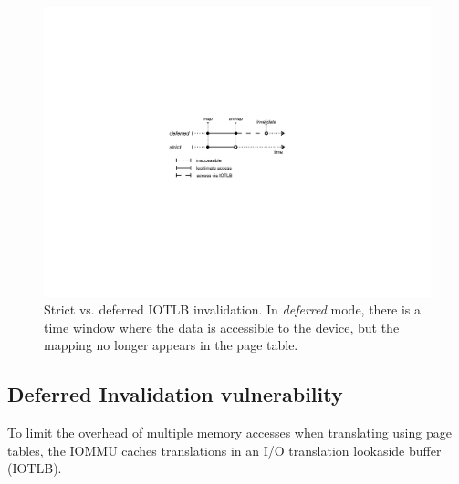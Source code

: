 

\begin{figure}[t]
    \centering
    \includegraphics[width=0.9\columnwidth]{figs/strict.pdf}
    \caption{Strict vs. deferred IOTLB invalidation. In \emph{deferred} mode, there is a time window where the data is accessible to the device, but the mapping no longer appears in the page table.}
    \label{fig:deferred}
\end{figure}

\subsection{Deferred Invalidation vulnerability}\label{sec:deferred}

To limit the overhead of multiple memory accesses when translating \iova{} using page tables, the IOMMU caches translations in an I/O translation lookaside buffer (IOTLB). 


